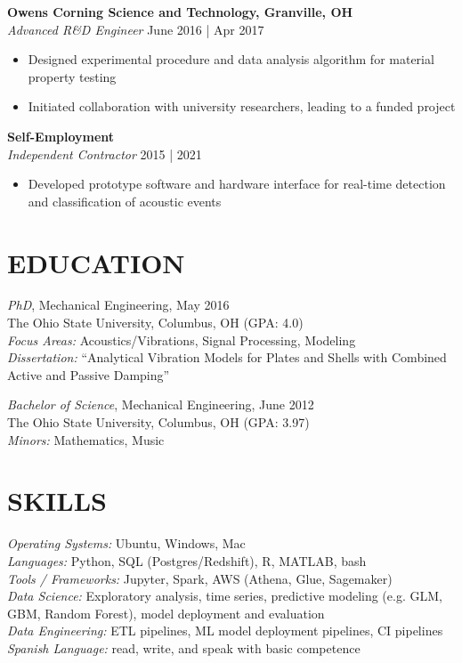 \documentclass[margin]{res}
\begin{document}
\begin{resume}
                {\bf Owens Corning Science and Technology, Granville, OH} \\
                {\sl Advanced R\&D Engineer} \hfill June 2016 | Apr 2017
                 \begin{itemize}
                 \item Designed experimental procedure and data analysis algorithm
                       for material property testing
                 \item Initiated collaboration with university
                       researchers, leading to a funded project 
                 \end{itemize}

                {\bf Self-Employment} \\
                {\sl Independent Contractor} \hfill 2015 | 2021
                 \begin{itemize} \itemsep -2pt
                 \item Developed prototype software and hardware interface for 
                       real-time detection and classification of acoustic events
                 \end{itemize} 


\section{EDUCATION} 
                {\sl PhD}, Mechanical Engineering, May 2016 \\
                The Ohio State University, Columbus, OH (GPA: 4.0) \\
                {\sl Focus Areas:} Acoustics/Vibrations, Signal Processing, Modeling \\
                {\sl Dissertation:} ``Analytical Vibration Models for Plates and 
                Shells with Combined Active and Passive Damping''

                {\sl Bachelor of Science}, Mechanical Engineering, June 2012 \\
                The Ohio State University, Columbus, OH (GPA: 3.97) \\ 
                {\sl Minors:} Mathematics, Music 
 
 
\section{SKILLS} 
               {\sl Operating Systems:} Ubuntu, Windows, Mac \\ 
               {\sl Languages:} Python, SQL (Postgres/Redshift), R, MATLAB, bash \\
               {\sl Tools / Frameworks:} Jupyter, Spark, AWS (Athena, Glue, Sagemaker) \\
               {\sl Data Science:} Exploratory analysis, time series, predictive modeling 
               (e.g. GLM, GBM, Random Forest), model deployment and evaluation \\
               {\sl Data Engineering:} ETL pipelines, ML model deployment pipelines, CI pipelines \\
               {\sl Spanish Language:} read, write, and speak with basic competence


\end{resume}
\end{document}
